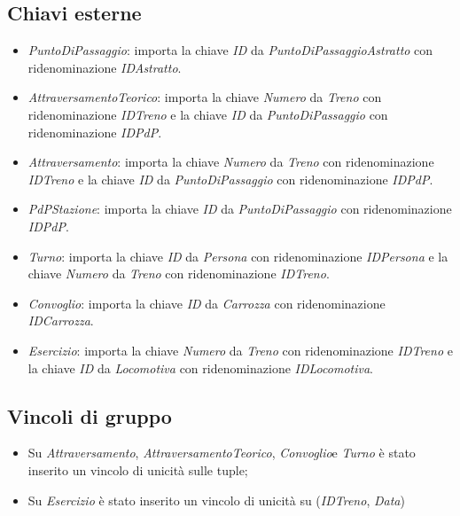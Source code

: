 \documentclass[a4paper,12pt]{report}
\begin{document}
	\subsection{Chiavi esterne}
	\begin{itemize}
		\item \textit{PuntoDiPassaggio}: importa la chiave \textit{ID} da \textit{PuntoDiPassaggioAstratto} con ridenominazione \textit{IDAstratto}.
		\item \textit{AttraversamentoTeorico}: importa la chiave \textit{Numero} da \textit{Treno} con ridenominazione \textit{IDTreno} e la chiave \textit{ID} da \textit{PuntoDiPassaggio} con ridenominazione \textit{IDPdP}.
		\item \textit{Attraversamento}: importa la chiave \textit{Numero} da \textit{Treno} con ridenominazione \textit{IDTreno} e la chiave \textit{ID} da \textit{PuntoDiPassaggio} con ridenominazione \textit{IDPdP}.
		\item \textit{PdPStazione}: importa la chiave \textit{ID} da \textit{PuntoDiPassaggio} con ridenominazione \textit{IDPdP}.
		\item \textit{Turno}: importa la chiave \textit{ID} da \textit{Persona} con ridenominazione \textit{IDPersona} e la chiave \textit{Numero} da \textit{Treno} con ridenominazione \textit{IDTreno}.
		\item \textit{Convoglio}: importa la chiave \textit{ID} da \textit{Carrozza} con ridenominazione \textit{IDCarrozza}.
		\item \textit{Esercizio}: importa la chiave \textit{Numero} da \textit{Treno} con ridenominazione \textit{IDTreno} e la chiave \textit{ID} da \textit{Locomotiva} con ridenominazione \textit{IDLocomotiva}.
	\end{itemize}
	\subsection{Vincoli di gruppo}
	\begin{itemize}
		\item Su \textit{Attraversamento}, \textit{AttraversamentoTeorico}, \textit{Convoglio}e \textit{Turno} è stato inserito un vincolo di unicità sulle tuple;
		\item Su \textit{Esercizio} è stato inserito un vincolo di unicità su (\textit{IDTreno}, \textit{Data})
	\end{itemize}
\end{document}
